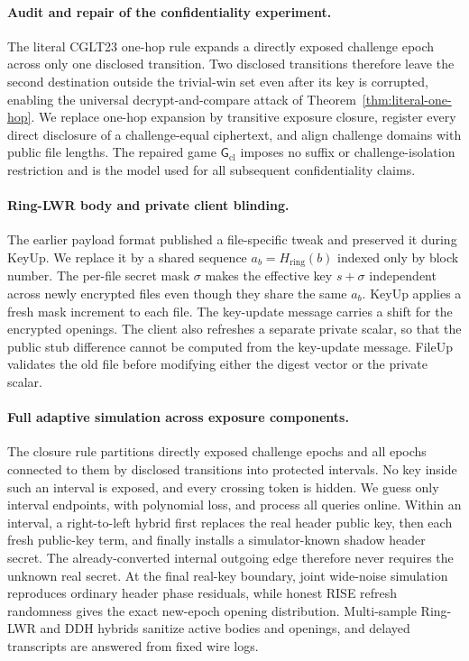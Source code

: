 \paragraph{Audit and repair of the confidentiality experiment.}
The literal CGLT23 one-hop rule expands a directly exposed challenge epoch across only one disclosed transition. Two disclosed transitions therefore leave the second destination outside the trivial-win set even after its key is corrupted, enabling the universal decrypt-and-compare attack of Theorem~\ref{thm:literal-one-hop}. We replace one-hop expansion by transitive exposure closure, register every direct disclosure of a challenge-equal ciphertext, and align challenge domains with public file lengths. The repaired game $\mathsf G_{\mathrm{cl}}$ imposes no suffix or challenge-isolation restriction and is the model used for all subsequent confidentiality claims.

\paragraph{Ring-LWR body and private client blinding.}
The earlier payload format published a file-specific tweak and preserved it during KeyUp. We replace it by a shared sequence $a_b=H_{\mathrm{ring}}(b)$ indexed only by block number. The per-file secret mask $\sigma$ makes the effective key $s+\sigma$ independent across newly encrypted files even though they share the same $a_b$. KeyUp applies a fresh mask increment to each file. The key-update message carries a shift for the encrypted openings. The client also refreshes a separate private scalar, so that the public stub difference cannot be computed from the key-update message. FileUp validates the old file before modifying either the digest vector or the private scalar.

\paragraph{Full adaptive simulation across exposure components.}
The closure rule partitions directly exposed challenge epochs and all epochs connected to them by disclosed transitions into protected intervals. No key inside such an interval is exposed, and every crossing token is hidden. We guess only interval endpoints, with polynomial loss, and process all queries online. Within an interval, a right-to-left hybrid first replaces the real header public key, then each fresh public-key term, and finally installs a simulator-known shadow header secret. The already-converted internal outgoing edge therefore never requires the unknown real secret. At the final real-key boundary, joint wide-noise simulation reproduces ordinary header phase residuals, while honest RISE refresh randomness gives the exact new-epoch opening distribution. Multi-sample Ring-LWR and DDH hybrids sanitize active bodies and openings, and delayed transcripts are answered from fixed wire logs.

